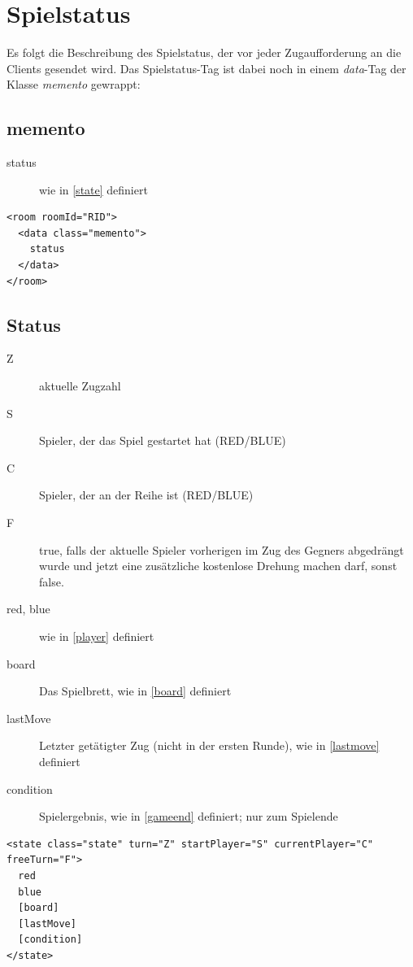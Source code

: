 \documentclass[12pt,a4paper, ngerman, oneside]{scrartcl}
\begin{document}
\section{Spielstatus}
Es folgt die Beschreibung des Spielstatus, der vor jeder Zugaufforderung an die Clients gesendet wird. Das Spielstatus-Tag ist dabei noch in einem \textit{data}-Tag der Klasse \textit{memento} gewrappt:
\subsection{memento}
\begin{description}
\item[status] wie in \ref{state} definiert
\end{description}
\begin{verbatim}
<room roomId="RID">
  <data class="memento">
  	status
  </data>
</room>
\end{verbatim}

\subsection{\label{state}Status}
\begin{description}
\item[Z] aktuelle Zugzahl
\item[S] Spieler, der das Spiel gestartet hat (RED/BLUE)
\item[C] Spieler, der an der Reihe ist (RED/BLUE)
\item[F] true, falls der aktuelle Spieler vorherigen im Zug des Gegners abgedrängt wurde und jetzt eine zusätzliche kostenlose Drehung machen darf, sonst false.
\item[red, blue] wie in \ref{player} definiert
\item[board] Das Spielbrett, wie in \ref{board} definiert
\item[lastMove] Letzter getätigter Zug (nicht in der ersten Runde), wie in
\ref{lastmove} definiert
\item[condition] Spielergebnis, wie in \ref{gameend} definiert; nur zum Spielende
\end{description}
\begin{verbatim}
<state class="state" turn="Z" startPlayer="S" currentPlayer="C" freeTurn="F">
  red
  blue
  [board]
  [lastMove]
  [condition]
</state>

\end{verbatim}
\end{document}
